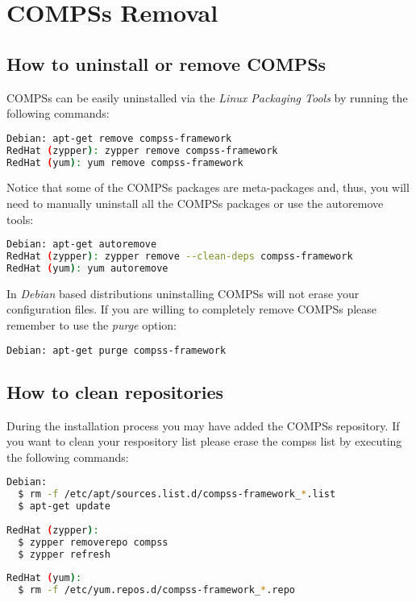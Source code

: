 \section{COMPSs Removal}
\label{sec:Removal}

\subsection{How to uninstall or remove COMPSs}
COMPSs can be easily uninstalled via the \textit{Linux Packaging Tools} by running the following commands:
\begin{lstlisting}[language=bash]
Debian: apt-get remove compss-framework
RedHat (zypper): zypper remove compss-framework
RedHat (yum): yum remove compss-framework
\end{lstlisting}

Notice that some of the COMPSs packages are meta-packages and, thus, you will need to manually uninstall all the COMPSs packages
or use the autoremove tools:
\begin{lstlisting}[language=bash]
Debian: apt-get autoremove
RedHat (zypper): zypper remove --clean-deps compss-framework
RedHat (yum): yum autoremove 
\end{lstlisting}

In \textit{Debian} based distributions uninstalling COMPSs will not erase your configuration files. If you are willing to completely
remove COMPSs please remember to use the \textit{purge} option: 
\begin{lstlisting}[language=bash]
Debian: apt-get purge compss-framework
\end{lstlisting}

\subsection{How to clean repositories}
During the installation process you may have added the COMPSs repository. If you want to clean your respository list please erase
the compss list by executing the following commands:
\begin{lstlisting}[language=bash]
Debian: 
  $ rm -f /etc/apt/sources.list.d/compss-framework_*.list
  $ apt-get update
  
RedHat (zypper):
  $ zypper removerepo compss
  $ zypper refresh 
  
RedHat (yum): 
  $ rm -f /etc/yum.repos.d/compss-framework_*.repo
\end{lstlisting}